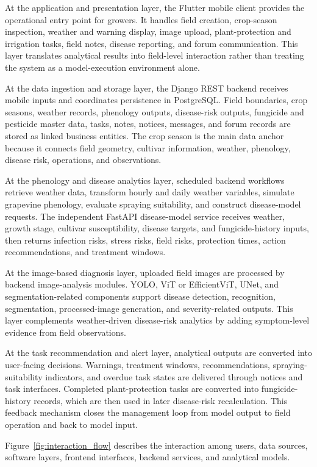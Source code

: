 \documentclass[11pt,a4paper]{article}
\begin{document}
At the application and presentation layer, the Flutter mobile client provides the operational entry point for growers. It handles field creation, crop-season inspection, weather and warning display, image upload, plant-protection and irrigation tasks, field notes, disease reporting, and forum communication. This layer translates analytical results into field-level interaction rather than treating the system as a model-execution environment alone.

At the data ingestion and storage layer, the Django REST backend receives mobile inputs and coordinates persistence in PostgreSQL. Field boundaries, crop seasons, weather records, phenology outputs, disease-risk outputs, fungicide and pesticide master data, tasks, notes, notices, messages, and forum records are stored as linked business entities. The crop season is the main data anchor because it connects field geometry, cultivar information, weather, phenology, disease risk, operations, and observations.

At the phenology and disease analytics layer, scheduled backend workflows retrieve weather data, transform hourly and daily weather variables, simulate grapevine phenology, evaluate spraying suitability, and construct disease-model requests. The independent FastAPI disease-model service receives weather, growth stage, cultivar susceptibility, disease targets, and fungicide-history inputs, then returns infection risks, stress risks, field risks, protection times, action recommendations, and treatment windows.

At the image-based diagnosis layer, uploaded field images are processed by backend image-analysis modules. YOLO, ViT or EfficientViT, UNet, and segmentation-related components support disease detection, recognition, segmentation, processed-image generation, and severity-related outputs. This layer complements weather-driven disease-risk analytics by adding symptom-level evidence from field observations.

At the task recommendation and alert layer, analytical outputs are converted into user-facing decisions. Warnings, treatment windows, recommendations, spraying-suitability indicators, and overdue task states are delivered through notices and task interfaces. Completed plant-protection tasks are converted into fungicide-history records, which are then used in later disease-risk recalculation. This feedback mechanism closes the management loop from model output to field operation and back to model input.

Figure~\ref{fig:interaction_flow} describes the interaction among users, data sources, software layers, frontend interfaces, backend services, and analytical models.
\end{document}

